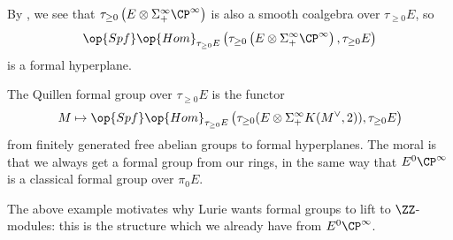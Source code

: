 \documentclass[../notes.tex]{subfiles}
\begin{document}
\begin{example}
	By , we see that $\tau_{\ge0}\left(E\otimes\Sigma_+^\infty\CP^\infty\right)$ is also a smooth coalgebra over $\tau_{\ge0}E$, so
	\[\op{Spf}\op{Hom}_{\tau_{\ge0}E}\left(\tau_{\ge0}\left(E\otimes\Sigma_+^\infty\CP^\infty\right),\tau_{\ge0}E\right)\]
	is a formal hyperplane.
\end{example}
\begin{example} \label{ex:quillen-formal-group}
	The Quillen formal group over $\tau_{\ge0}E$ is the functor
	\[M\mapsto\op{Spf}\op{Hom}_{\tau_{\ge0}E}\left(\tau_{\ge0}(E\otimes\Sigma_+^\infty K(M^\lor,2)),\tau_{\ge0}E\right)\]
	from finitely generated free abelian groups to formal hyperplanes. The moral is that we always get a formal group from our rings, in the same way that $E^0\CP^\infty$ is a classical formal group over $\pi_0E$.
\end{example}
The above example motivates why Lurie wants formal groups to lift to $\ZZ$-modules: this is the structure which we already have from $E^0\CP^\infty$.
\end{document}
